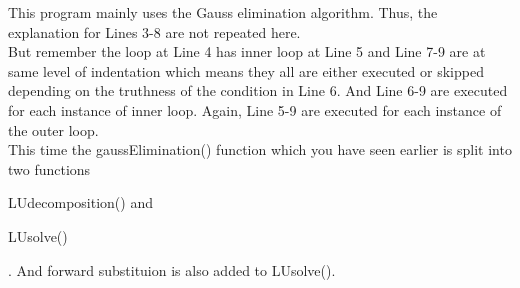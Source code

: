 \begin{commentary}
	This program mainly uses the Gauss elimination algorithm. Thus, the explanation for Lines 3-8 are not repeated here.\\

	But remember the loop at Line 4 has inner loop at Line 5 and Line 7-9 are at same level of indentation which means they all are either executed or skipped depending on the truthness of the condition in Line 6. And Line 6-9 are executed for each instance of inner loop. Again, Line 5-9 are executed for each instance of the outer loop.\\

This time the gaussElimination() function which you have seen earlier is split into two functions \begin{enumerate*} \item LUdecomposition() and \item LUsolve() \end{enumerate*}. And forward substituion is also added to LUsolve().


\end{commentary}
